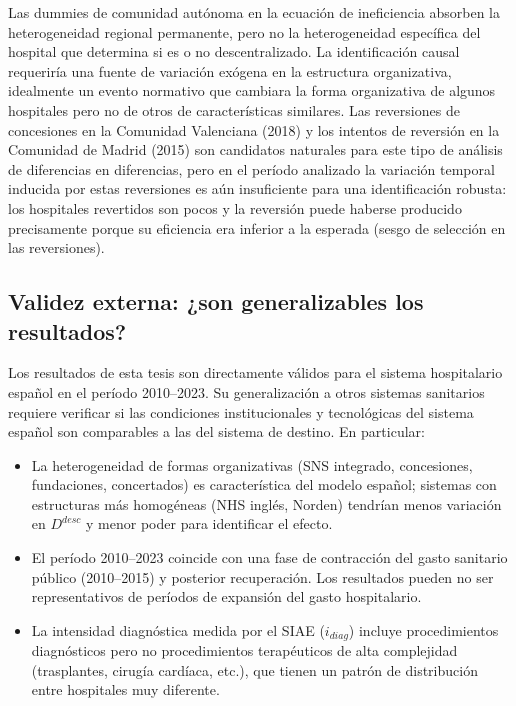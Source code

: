 \documentclass[12pt, a4paper, twoside, openright]{book}
\theoremstyle{plain}
\theoremstyle{definition}
\theoremstyle{remark}
\begin{document}
Las dummies de comunidad autónoma en la ecuación de ineficiencia absorben la heterogeneidad regional permanente, pero no la heterogeneidad específica del hospital que determina si es o no descentralizado. La identificación causal requeriría una fuente de variación exógena en la estructura organizativa, idealmente un evento normativo que cambiara la forma organizativa de algunos hospitales pero no de otros de características similares. Las reversiones de concesiones en la Comunidad Valenciana (2018) y los intentos de reversión en la Comunidad de Madrid (2015) son candidatos naturales para este tipo de análisis de diferencias en diferencias, pero en el período analizado la variación temporal inducida por estas reversiones es aún insuficiente para una identificación robusta: los hospitales revertidos son pocos y la reversión puede haberse producido precisamente porque su eficiencia era inferior a la esperada (sesgo de selección en las reversiones).

\subsection{Validez externa: ¿son generalizables los resultados?}

Los resultados de esta tesis son directamente válidos para el sistema hospitalario español en el período 2010--2023. Su generalización a otros sistemas sanitarios requiere verificar si las condiciones institucionales y tecnológicas del sistema español son comparables a las del sistema de destino. En particular:

\begin{itemize}
  \item La heterogeneidad de formas organizativas (SNS integrado, concesiones, fundaciones, concertados) es característica del modelo español; sistemas con estructuras más homogéneas (NHS inglés, Norden) tendrían menos variación en $D^{desc}$ y menor poder para identificar el efecto.
  \item El período 2010--2023 coincide con una fase de contracción del gasto sanitario público (2010--2015) y posterior recuperación. Los resultados pueden no ser representativos de períodos de expansión del gasto hospitalario.
  \item La intensidad diagnóstica medida por el SIAE ($i_{diag}$) incluye procedimientos diagnósticos pero no procedimientos terapéuticos de alta complejidad (trasplantes, cirugía cardíaca, etc.), que tienen un patrón de distribución entre hospitales muy diferente.
\end{itemize}
\end{document}
